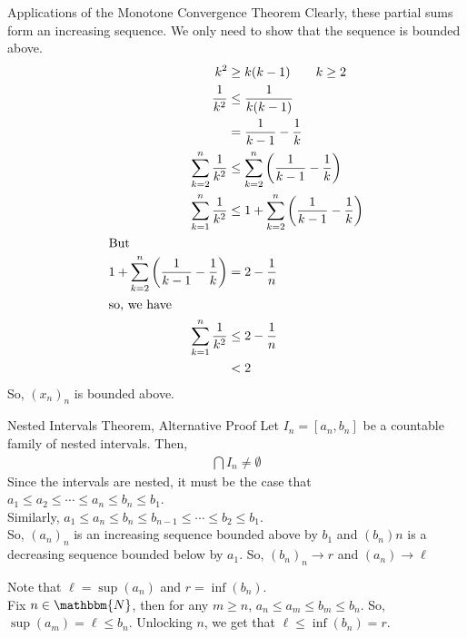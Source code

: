\documentclass[10pt]{extarticle}
\newcommand{\N}{\mathbbm{N}}
\begin{document}
\begin{problem}{Applications of the Monotone Convergence Theorem}
    Clearly, these partial sums form an increasing sequence. We only need to show that the sequence is bounded above.
    \begin{align*}
      k^2 &\geq k(k-1)\tag*{$k\geq 2$}\\
      \frac{1}{k^2} &\leq \frac{1}{k(k-1)}\\
                    &= \frac{1}{k-1}-\frac{1}{k}\\
      \sum_{k=2}^{n} \frac{1}{k^2} &\leq \sum_{k=2}^{n} \left(\frac{1}{k-1}-\frac{1}{k}\right)\\
      \sum_{k=1}^{n} \frac{1}{k^2} &\leq 1 + \sum_{k=2}^{n} \left(\frac{1}{k-1}-\frac{1}{k}\right)\\
      \shortintertext{But}
      1 + \sum_{k=2}^{n} \left(\frac{1}{k-1}-\frac{1}{k}\right) &= 2 - \frac{1}{n}\\
      \shortintertext{so, we have}
      \sum_{k=1}^{n} \frac{1}{k^2} &\leq 2-\frac{1}{n}\\
                                   &< 2
    \end{align*}
    So, $(x_n)_n$ is bounded above.
  \end{problem}
  \begin{problem}{Nested Intervals Theorem, Alternative Proof}
    Let $I_n = [a_n,b_n]$ be a countable family of nested intervals. Then,
    \begin{align*}
      \bigcap I_n \neq \emptyset
    \end{align*}
    \tcblower
    Since the intervals are nested, it must be the case that $a_{1} \leq a_2 \leq \cdots \leq a_{n} \leq b_{n} \leq b_{1}$.\\

    Similarly, $a_1 \leq a_{n} \leq b_{n} \leq b_{n-1} \leq \cdots \leq b_{2} \leq b_{1}$.\\

    So, $\left(a_n\right)_n$ is an increasing sequence bounded above by $b_{1}$ and $\left(b_n\right)n$ is a decreasing sequence bounded below by $a_{1}$. So, $\left(b_n\right)_n \rightarrow r$ and $\left(a_n\right)\rightarrow \ell$

    Note that $\ell = \sup(a_n)$ and $r = \inf(b_n)$.\\

    Fix $n\in\N$, then for any $m \geq n$, $a_{n} \leq a_{m} \leq b_{m} \leq b_{n}$. So, $\sup(a_m) = \ell \leq b_{n}$. Unlocking $n$, we get that $\ell \leq \inf(b_n) = r$.
  \end{problem}
\end{document}
